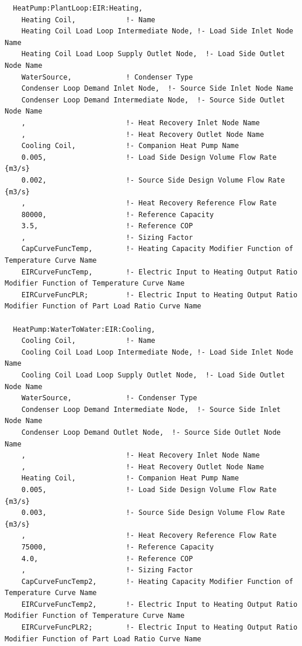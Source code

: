 \begin{lstlisting}
  HeatPump:PlantLoop:EIR:Heating,
    Heating Coil,            !- Name
    Heating Coil Load Loop Intermediate Node, !- Load Side Inlet Node Name
    Heating Coil Load Loop Supply Outlet Node,  !- Load Side Outlet Node Name
    WaterSource,             ! Condenser Type
    Condenser Loop Demand Inlet Node,  !- Source Side Inlet Node Name
    Condenser Loop Demand Intermediate Node,  !- Source Side Outlet Node Name
    ,                        !- Heat Recovery Inlet Node Name
    ,                        !- Heat Recovery Outlet Node Name
    Cooling Coil,            !- Companion Heat Pump Name
    0.005,                   !- Load Side Design Volume Flow Rate {m3/s}
    0.002,                   !- Source Side Design Volume Flow Rate {m3/s}
    ,                        !- Heat Recovery Reference Flow Rate
    80000,                   !- Reference Capacity
    3.5,                     !- Reference COP
    ,                        !- Sizing Factor
    CapCurveFuncTemp,        !- Heating Capacity Modifier Function of Temperature Curve Name
    EIRCurveFuncTemp,        !- Electric Input to Heating Output Ratio Modifier Function of Temperature Curve Name
    EIRCurveFuncPLR;         !- Electric Input to Heating Output Ratio Modifier Function of Part Load Ratio Curve Name

  HeatPump:WaterToWater:EIR:Cooling,
    Cooling Coil,            !- Name
    Cooling Coil Load Loop Intermediate Node, !- Load Side Inlet Node Name
    Cooling Coil Load Loop Supply Outlet Node,  !- Load Side Outlet Node Name
    WaterSource,             !- Condenser Type
    Condenser Loop Demand Intermediate Node,  !- Source Side Inlet Node Name
    Condenser Loop Demand Outlet Node,  !- Source Side Outlet Node Name
    ,                        !- Heat Recovery Inlet Node Name
    ,                        !- Heat Recovery Outlet Node Name
    Heating Coil,            !- Companion Heat Pump Name
    0.005,                   !- Load Side Design Volume Flow Rate {m3/s}
    0.003,                   !- Source Side Design Volume Flow Rate {m3/s}
    ,                        !- Heat Recovery Reference Flow Rate
    75000,                   !- Reference Capacity
    4.0,                     !- Reference COP
    ,                        !- Sizing Factor
    CapCurveFuncTemp2,       !- Heating Capacity Modifier Function of Temperature Curve Name
    EIRCurveFuncTemp2,       !- Electric Input to Heating Output Ratio Modifier Function of Temperature Curve Name
    EIRCurveFuncPLR2;        !- Electric Input to Heating Output Ratio Modifier Function of Part Load Ratio Curve Name
\end{lstlisting}

